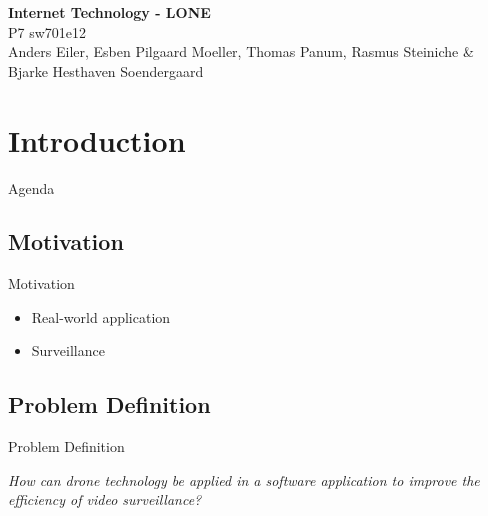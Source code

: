 \begin{frame}{}
	\begin{center}
		\huge \textbf{Internet Technology - LONE}\\
		\normalsize P7 sw701e12\\
		\tiny{Anders Eiler, Esben Pilgaard Moeller, Thomas Panum,}
		\tiny{Rasmus Steiniche \& Bjarke Hesthaven Soendergaard}
	\end{center}
\end{frame}

\section{Introduction}
\begin{frame}{Agenda}{}
\tableofcontents
\end{frame}

\subsection{Motivation}
\begin{frame}{Motivation}
\begin{itemize}
	\item Real-world application
	\item Surveillance
\end{itemize}
\end{frame}

\subsection{Problem Definition}
\begin{frame}{Problem Definition}
\begin{center}
	\textit{How can drone technology be applied in a software application to improve the efficiency of video surveillance?}
\end{center}
\end{frame}
